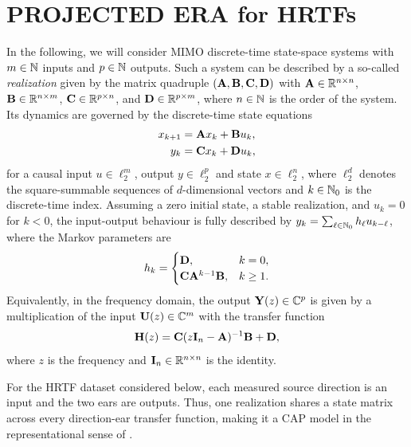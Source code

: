 \documentclass[non-peer-review]{fa2026}
\begin{document}
\section{PROJECTED \acs{ERA} for \acp{HRTF}}
\label{sec:methods}
%
In the following, we will consider MIMO discrete-time state-space systems with \(m\in\N\) inputs and \(p\in\N\) outputs.
Such a system can be described by a so-called \emph{realization} given by the matrix quadruple
\((\mathbf{A},\mathbf{B},\mathbf{C},\mathbf{D})\) with \(\matA\in\R[n][n]\), \(\matB\in\R[n][m]\), \(\matC\in\R[p][n]\), and
\(\matD\in\R[p][m]\), where \(n\in\N\) is the order of the system. Its dynamics are governed by the discrete-time state
equations
%
\begin{align*}
  x_{k+1}&=\mathbf{A} x_k+\mathbf{B} u_k,\\y_k&=\mathbf{C} x_k+\mathbf{D} u_k,
\end{align*}
%
for a causal input \(u\in\ell_{2}^{m}\), output \(y\in\ell_{2}^{p}\) and state \(x\in\ell_{2}^{n}\), where \(\ell_2^d\)
denotes the square-summable sequences of \(d\)-dimensional vectors and \(k\in\N_0\) is the discrete-time index. Assuming
a zero initial state, a stable realization, and \(u_k=0\) for \(k<0\), the input-output behaviour is fully described by
\(y_k=\sum_{\ell\in\N_0}h_\ell u_{k-\ell}\), where the Markov parameters are
%
\begin{equation}
  h_k=
  \begin{cases}
    \mathbf{D}, & k=0,\\
    \mathbf{C}\mathbf{A}^{k-1}\mathbf{B}, & k\geq1.
  \end{cases}
  \label{eq:markov-parameters}
\end{equation}
%
Equivalently, in the frequency domain, the output \(\matY(z)\in\C[p]\) is given by a multiplication of the input
\(\matU(z)\in\C[m]\) with the transfer function
%
\begin{equation*}
  \mathbf{H}(z)=\mathbf{C}(z\mathbf{I}_n-\mathbf{A})^{-1}\mathbf{B}+\mathbf{D},
\end{equation*}
%
where \(z\) is the frequency and \(\matI_n\in\R^{n\times n}\) is the identity.

For the \ac{HRTF} dataset considered below, each measured source direction is an input and the two ears are outputs.
Thus, one realization shares a state matrix across every direction-ear transfer function, making it a \ac{CAP} model in
the representational sense of \cite{haneda1999a}.
%
%
\end{document}
